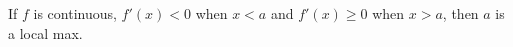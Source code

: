 \documentclass{ximera}
\author{Steven Gubkin}
\begin{document}
\begin{exercise}

	If $f$ is continuous, $f'(x)<0$ when $x<a$ and $f'(x) \geq 0$ when $x>a$, then $a$ is a local max.
	\begin{multipleChoice}	
	\end{multipleChoice}

\end{exercise}
\end{document}
